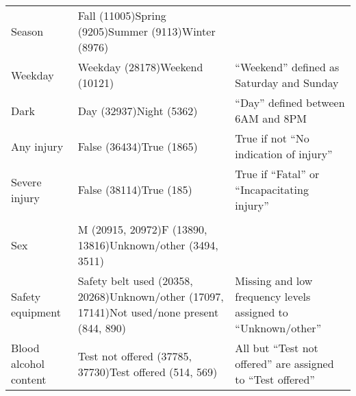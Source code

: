 \begin{tabular}{>{\raggedright\arraybackslash}p{3cm}>{\raggedright\arraybackslash}p{7cm}>{\raggedright\arraybackslash}p{4cm}}
Season  &  Fall (11005)\newline Spring (9205)\newline Summer (9113)\newline Winter (8976) &                                         \\
Weekday &                                         Weekday (28178)\newline Weekend (10121) &  ``Weekend'' defined as Saturday and Sunday \\
Dark    &                                                Day (32937)\newline Night (5362) &         ``Day'' defined between 6AM and 8PM \\
Any injury    &                                                                     False (36434)\newline True (1865) &     True if not ``No indication of injury''\\
Severe injury &                                                                      False (38114)\newline True (185) &  True if ``Fatal'' or ``Incapacitating injury'' \\
\midrule


\multicolumn{3}{l}{\textbf{Drivers}}\\\addlinespace
Sex              &                                                                                                                                                                                                                                                                        M (20915, 20972)\newline F (13890, 13816)\newline Unknown/other (3494, 3511) &                                                      \\
Safety equipment &                                                                                                                                                                                                                                     Safety belt used (20358, 20268)\newline Unknown/other (17097, 17141)\newline Not used/none present (844, 890) &                                  Missing and low frequency levels assigned to ``Unknown/other'' \\
Blood alcohol content       &                                                                                                                                                                                                                                                                            Test not offered (37785, 37730)\newline Test offered (514, 569) &  All but ``Test not offered'' are assigned to ``Test offered'' \\



\end{tabular}
